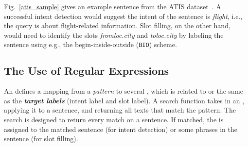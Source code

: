 
 Fig.~\ref{atis_sample} gives an example sentence from the ATIS dataset~\cite{hemphill1990atis}. A successful intent
detection would suggest the intent of the sentence is \emph{flight}, i.e., the query is about flight-related information. Slot filling,
on the other hand, would need to identify the slots \emph{fromloc.city} and \emph{toloc.city} by labeling the sentence using e.g.,
the begin-inside-outside (\texttt{BIO}) scheme.




%


\subsection{The Use of Regular Expressions}
\label{re_desc}

An \RE defines a mapping from a \emph{pattern} to several \textbf{\emph{\REtags}}, which is related to or the same as the \textbf{\emph{target labels}} (intent label and slot label).
A search function takes in an \RE, applying it to a sentence, and returning all texts that match the pattern.
The search is designed to return every match on a sentence.
If matched, the \REtag is assigned to the matched sentence (for intent detection) or some phrases in the sentence (for slot filling).

